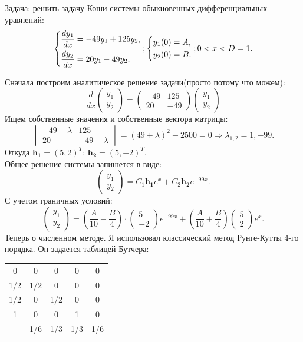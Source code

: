 \documentclass[11pt]{article}
\newcommand{\ve}[1]{\mathbf{#1}}
\begin{document}
 Задача: решить задачу Коши системы обыкновенных дифференциальных уравнений: \\
 \[
  \begin{dcases} 
   \frac{dy_1}{dx} = -49y_1 + 125y_2, \\
   \frac{dy_2}{dx} = 20y_1 - 49y_2.
  \end{dcases}
  ;
  \begin{dcases}
   y_1(0) = A, \\
   y_2(0) = B.
  \end{dcases}
  ;
  0 < x < D = 1.
\]

 Сначала построим аналитическое решение задачи(просто потому что можем):\\
\[
\frac{d}{dx}
 \begin{pmatrix}
  y_1 \\
  y_2
 \end{pmatrix}
 =
 \begin{pmatrix}
  -49 & 125 \\
  20 & -49
 \end{pmatrix}
 \begin{pmatrix}
  y_1 \\
  y_2
 \end{pmatrix}
\]
Ищем собственные значения и собственные вектора матрицы:
\[
 \begin{vmatrix}
  -49 - \lambda & 125 \\
  20 & -49 - \lambda
 \end{vmatrix}
 =
 (49 + \lambda)^2 - 2500 = 0 \Rightarrow \lambda_{1,2} = 1, -99.
\]
Откуда $\ve{h_1} = (5, 2)^T $; $\ve{h_2} = (5, -2)^T$. \\
Общее решение системы запишется в виде:
\[
 \begin{pmatrix}
  y_1 \\
  y_2
 \end{pmatrix}
  =
  C_1 \ve{h_1} e^x + C_2 \ve{h_2} e^{-99x}.
\]
С учетом граничных условий:
\[
 \begin{pmatrix}
  y_1 \\
  y_2
 \end{pmatrix}
 =
 \left(\frac{A}{10} - \frac{B}{4}\right)\cdot
 \begin{pmatrix}
   5 \\
   -2
 \end{pmatrix}
 e^{-99x}
 + 
 \left(\frac{A}{10} + \frac{B}{4}\right)
 \begin{pmatrix}
  5 \\
  2
 \end{pmatrix}
 e^{x}.
\]
Теперь о численном методе. Я использовал классический метод Рунге-Кутты 4-го порядка. Он задается таблицей Бутчера: \\
\begin{tabular}{c | c c c c}
0 & 0 & 0 & 0 & 0 \\
1/2 & 1/2 & 0 & 0 & 0 \\
1/2 & 0 & 1/2 & 0 & 0 \\
1 & 0 & 0 & 1 & 0 \\ \hline
 & 1/6 & 1/3 & 1/3 & 1/6 
\end{tabular} 
\end{document}
